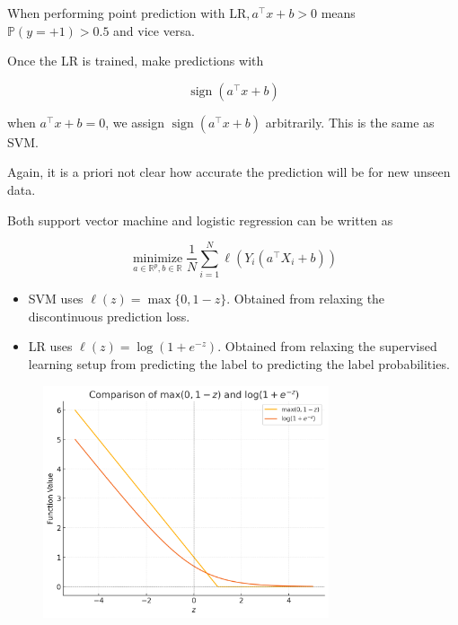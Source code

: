 \begin{concept}
    When performing point prediction with $\mathrm{LR}, a^{\top} x+b>0$ means $\mathbb{P}(y=+1)>0.5$ and vice versa.

    Once the LR is trained, make predictions with

    $$
    \operatorname{sign}\left(a^{\top} x+b\right)
    $$

    when $a^{\top} x+b=0$, we assign $\operatorname{sign}\left(a^{\top} x+b\right)$ arbitrarily. This is the same as SVM.

    Again, it is a priori not clear how accurate the prediction will be for new unseen data.
\end{concept}

\begin{concept}[3.15][SVM vs LR]
    Both support vector machine and logistic regression can be written as

    $$
    \underset{a \in \mathbb{R}^{p}, b \in \mathbb{R}}{\operatorname{minimize}} \frac{1}{N} \sum_{i=1}^{N} \ell\left(Y_{i}\left(a^{\top} X_{i}+b\right)\right)
    $$

    \begin{itemize}
        \item SVM uses $\ell(z)=\max \{0,1-z\}$. Obtained from relaxing the discontinuous prediction loss.
        \item LR uses $\ell(z)=\log \left(1+e^{-z}\right)$. Obtained from relaxing the supervised learning setup from predicting the label to predicting the label probabilities.
    \end{itemize}

    \begin{figure}[H]
        \centering
        \includegraphics[width=0.75\textwidth]{.././assets/3.2.png}
    \end{figure}


\end{concept}
